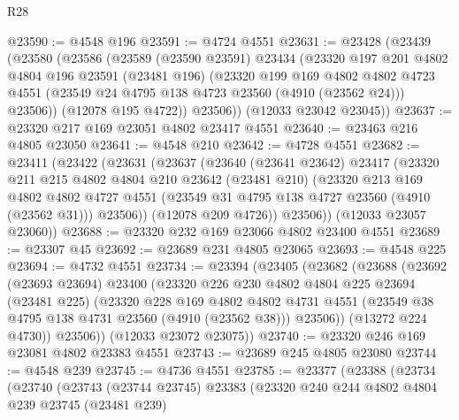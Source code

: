 \begin{lexlean}{R28}
\begin{coremodule}
@23590 := @4548 @196
@23591 := @4724 @4551
@23631 := @23428
    (@23439
      (@23580
        (@23586
          (@23589
            (@23590 @23591)
            @23434
            (@23320
              @197
              @201
              @4802
              @4804
              @196
              @23591
              (@23481 @196)
              (@23320
                @199
                @169
                @4802
                @4802
                @4723
                @4551
                (@23549 @24 @4795 @138 @4723 @23560 (@4910 (@23562 @24)))
                @23506))
            (@12078 @195 @4722))
          @23506))
      (@12033 @23042 @23045))
@23637 := @23320 @217 @169 @23051 @4802 @23417 @4551
@23640 := @23463 @216 @4805 @23050
@23641 := @4548 @210
@23642 := @4728 @4551
@23682 := @23411
    (@23422
      (@23631
        (@23637
          (@23640
            (@23641 @23642)
            @23417
            (@23320
              @211
              @215
              @4802
              @4804
              @210
              @23642
              (@23481 @210)
              (@23320
                @213
                @169
                @4802
                @4802
                @4727
                @4551
                (@23549 @31 @4795 @138 @4727 @23560 (@4910 (@23562 @31)))
                @23506))
            (@12078 @209 @4726))
          @23506))
      (@12033 @23057 @23060))
@23688 := @23320 @232 @169 @23066 @4802 @23400 @4551
@23689 := @23307 @45
@23692 := @23689 @231 @4805 @23065
@23693 := @4548 @225
@23694 := @4732 @4551
@23734 := @23394
    (@23405
      (@23682
        (@23688
          (@23692
            (@23693 @23694)
            @23400
            (@23320
              @226
              @230
              @4802
              @4804
              @225
              @23694
              (@23481 @225)
              (@23320
                @228
                @169
                @4802
                @4802
                @4731
                @4551
                (@23549 @38 @4795 @138 @4731 @23560 (@4910 (@23562 @38)))
                @23506))
            (@13272 @224 @4730))
          @23506))
      (@12033 @23072 @23075))
@23740 := @23320 @246 @169 @23081 @4802 @23383 @4551
@23743 := @23689 @245 @4805 @23080
@23744 := @4548 @239
@23745 := @4736 @4551
@23785 := @23377
    (@23388
      (@23734
        (@23740
          (@23743
            (@23744 @23745)
            @23383
            (@23320
              @240
              @244
              @4802
              @4804
              @239
              @23745
              (@23481 @239)

\end{coremodule}
\end{lexlean}
